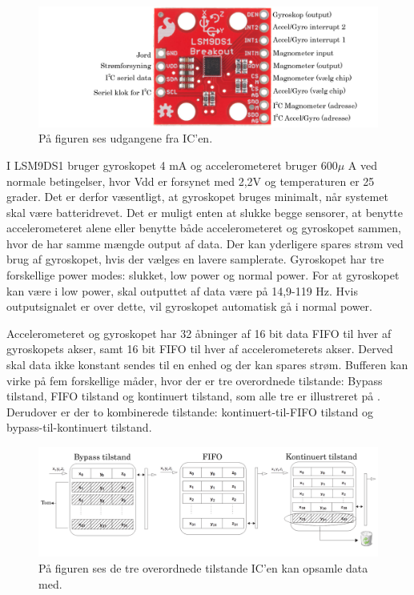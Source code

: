 \begin{figure}[H]
	\centering
	\includegraphics[scale=0.35]{figures/cDesign/accelerometeret.png}
	\caption{På figuren ses udgangene fra IC'en.\citep{Jimb02016}}
	\label{IC_pins}
\end{figure}
I LSM9DS1 bruger gyroskopet 4 mA og accelerometeret bruger 600$\mu$ A ved normale betingelser, hvor Vdd er forsynet med 2,2V og temperaturen er 25 grader. Det er derfor væsentligt, at gyroskopet bruges minimalt, når systemet skal være batteridrevet. Det er muligt enten at slukke begge sensorer, at benytte accelerometeret alene eller benytte både accelerometeret og gyroskopet sammen, hvor de har samme mængde output af data. Der kan yderligere spares strøm ved brug af gyroskopet, hvis der vælges en lavere samplerate. %
Gyroskopet har tre forskellige power modes: slukket, low power og normal power. For at gyroskopet kan være i low power, skal outputtet af data være på 14,9-119 Hz. Hvis outputsignalet er over dette, vil gyroskopet automatisk gå i normal power. 

Accelerometeret og gyroskopet har 32 åbninger af 16 bit data FIFO til hver af gyroskopets akser, samt 16 bit FIFO til hver af accelerometerets akser. Derved skal data ikke konstant sendes til en enhed og der kan spares strøm. Bufferen kan virke på fem forskellige måder, hvor der er tre overordnede tilstande: Bypass tilstand, FIFO tilstand og kontinuert tilstand, som alle tre er illustreret på . Derudover er der to kombinerede tilstande: kontinuert-til-FIFO tilstand og bypass-til-kontinuert tilstand. \newline

\begin{figure}[H]
	\centering
	\includegraphics[scale=0.28]{figures/cDesign/LSM9DS1_tilstand.png}
	\caption{På figuren ses de tre overordnede tilstande IC'en kan opsamle data med.\citep{Jimb02016}}
	\label{tilstand}
\end{figure}

